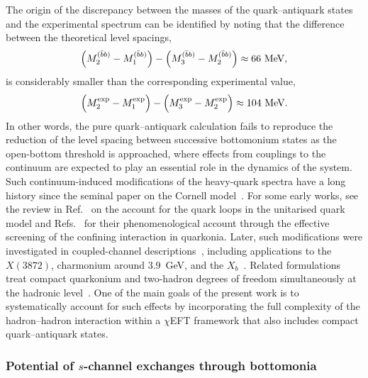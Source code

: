\documentclass[aps,prd,showpacs,amsmath,twocolumn,superscriptaddress,floatfix,nofootinbib,notitlepage]{revtex4-2}
\newcommand{\be}{\begin{equation}}
\newcommand{\ee}{\end{equation}}
\newcommand{\QQ}{\bar{b}b}
\newcommand{\X}{X(3872)}
\newcommand{\Xb}{X_b}
\begin{document}
The origin of the discrepancy between the masses of the quark--antiquark states and the experimental spectrum can be identified by noting that the difference between the theoretical level spacings,
\be
\Bigl(M_2^{(\QQ)}-M_1^{(\QQ)}\Bigr)-\Bigl(M_3^{(\QQ)}-M_2^{(\QQ)}\Bigr)
\approx 66~\mbox{MeV},
\ee
is considerably smaller than the corresponding experimental value,
\be
\Bigl(M_2^{\rm exp}-M_1^{\rm exp}\Bigr)-\Bigl(M_3^{\rm exp}-M_2^{\rm exp}\Bigr)
\approx 104~\mbox{MeV}.
\ee
In other words, the pure quark--antiquark calculation fails to reproduce the reduction of the level spacing between successive bottomonium states as the open-bottom threshold is approached, where effects from couplings to the continuum are expected to play an essential role in the dynamics of the system. Such continuum-induced modifications of the heavy-quark spectra have a long history since the seminal paper on the Cornell model~\cite{Eichten:1978tg}. 
For some early works, see the review in Ref.~\cite{Tornqvist:1984xz} on the account for the quark loops in the unitarised quark model and Refs.~\cite{Brisudova:1998wq,Brisudova:1999ut} for their phenomenological account through the effective screening of the confining interaction in quarkonia. Later, such modifications were investigated in coupled-channel descriptions~\cite{Eichten:2004uh,Kalashnikova:2005ui,Liu:2011yp,Lu:2016mbb,Ni:2025gvx,Zhang:2026nmz}, including applications to the $ \X$, charmonium around 3.9~GeV, and the $\Xb$~\cite{Ortega:2009hj,Cincioglu:2016fkm,Ortega:2017qmg,Ortega:2021zgk}. Related formulations treat compact quarkonium and two-hadron degrees of freedom simultaneously at the hadronic level~\cite{Baru:2010ww,Hanhart:2011jz,Guo:2016bjq,Zhou:2017dwj,Xiao:2023lpv,Wang:2023ovj,Shi:2024llv}.
One of the main goals of the present work is to systematically account for such effects by incorporating the full complexity of the hadron--hadron interaction within a $\chi$EFT framework that also includes compact quark--antiquark states.

\subsubsection{Potential of $s$-channel exchanges through bottomonia}
\label{sec:schannel}
\end{document}
